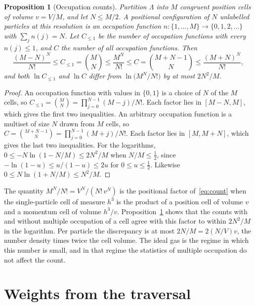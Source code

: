 \documentclass[11pt,a4paper]{article}
\newtheorem{proposition}[theorem]{Proposition}
\theoremstyle{definition}
\theoremstyle{remark}
\begin{document}
\begin{proposition}[Occupation counts]
\label{prop:occupation}
Partition $\Lambda$ into $M$ congruent position cells of volume $v=V/M$, and let $N\le M/2$.
A positional configuration of $N$ unlabelled particles at this resolution is an \emph{occupation function} $n\colon\{1,\dots,M\}\to\{0,1,2,\dots\}$ with $\sum_jn(j)=N$.
Let $C_{\le1}$ be the number of occupation functions with every $n(j)\le1$, and $C$ the number of all occupation functions.
Then
\begin{equation}
\frac{(M-N)^{N}}{N!}\le C_{\le1}=\binom{M}{N}\le\frac{M^{N}}{N!}\le C=\binom{M+N-1}{N}\le\frac{(M+N)^{N}}{N!},
\label{eq:occupation-bounds}
\end{equation}
and both $\ln C_{\le1}$ and $\ln C$ differ from $\ln\bigl(M^{N}/N!\bigr)$ by at most $2N^{2}/M$.
\end{proposition}

\begin{proof}
An occupation function with values in $\{0,1\}$ is a choice of $N$ of the $M$ cells, so $C_{\le1}=\binom MN=\prod_{j=0}^{N-1}(M-j)/N!$.
Each factor lies in $[M-N,M]$, which gives the first two inequalities.
An arbitrary occupation function is a multiset of size $N$ drawn from $M$ cells, so $C=\binom{M+N-1}{N}=\prod_{j=0}^{N-1}(M+j)/N!$.
Each factor lies in $[M,M+N]$, which gives the last two inequalities.
For the logarithms, $0\le-N\ln(1-N/M)\le2N^{2}/M$ when $N/M\le\tfrac12$, since $-\ln(1-u)\le u/(1-u)\le2u$ for $0\le u\le\tfrac12$.
Likewise $0\le N\ln(1+N/M)\le N^{2}/M$.
\end{proof}

The quantity $M^{N}/N!=V^{N}/(N!\,v^{N})$ is the positional factor of~\eqref{eq:count} when the single-particle cell of measure $h^{3}$ is the product of a position cell of volume $v$ and a momentum cell of volume $h^{3}/v$.
Proposition~\ref{prop:occupation} shows that the counts with and without multiple occupation of a cell agree with this factor to within $2N^{2}/M$ in the logarithm.
Per particle the discrepancy is at most $2N/M=2(N/V)v$, the number density times twice the cell volume.
The ideal gas is the regime in which this number is small, and in that regime the statistics of multiple occupation do not affect the count.

\section{Weights from the traversal}
\label{sec:weights}
\end{document}
